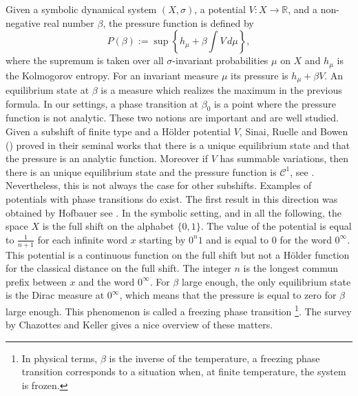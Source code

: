 \documentclass[11 pt]{article}
\def\R{{\mathbb R}}
\def\s{\sigma}
\def\be{\beta}
\theoremstyle{definition}
\begin{document}
Given a symbolic dynamical system $(X,\s)$, a potential  $V:X\to\R$, and a non-negative real number $\beta$, the pressure function is defined by 
$$P(\be):=\sup\left\{h_{\mu}+\be\int V\,d\mu\right\},$$
where the supremum is taken over all $\s$-invariant probabilities $\mu$ on $X$ and $h_{\mu}$ is the Kolmogorov entropy. For an invariant measure $\mu$ its pressure is $h_\mu+\beta V$.
An equilibrium state at $\be$ is a measure which realizes the maximum in the previous formula. In our settings, a phase transition at $\be_{0}$ is a point where the pressure function is not analytic. These two notions are important and are well studied.
Given a subshift of finite type and a H\"older potential $V$, Sinai, Ruelle and Bowen (\cite{sinai,Ruelle.78,Bow.08}) proved in their seminal works that there is a unique equilibrium state and that the pressure is an analytic function. Moreover if $V$ has summable variations, then there is an unique equilibrium state and the pressure function is $\mathcal C^1$, see \cite{Walters.75}.
Nevertheless, this is not always the case for other subshifts. Examples of potentials with phase transitions do exist. The first result in this direction was obtained by  Hofbauer    
see \cite{Hofbauer-77}. In the symbolic setting, and in all the following, the space $X$ is the full shift on the alphabet $\{0,1\}$. The value of the potential is equal to $\frac{1}{n+1}$ for each infinite word $x$ starting by $0^n1$ and is equal to $0$ for the word $0^\infty$. This potential is a continuous function on the full shift but not a H\"older function for the classical distance on the full shift.
The integer $n$ is the longest commun prefix between $x$ and the word $0^\infty$. 
For $\beta$ large enough, the only equilibrium state is the Dirac measure at $0^\infty$, which means that the pressure is equal to zero for $\beta$ large enough. This phenomenon is called a freezing phase transition \footnote{In physical terms, $\beta$ is the inverse of the temperature, a freezing phase transition corresponds to a situation when, at finite temperature, the system is frozen.}. The survey by Chazottes and Keller \cite{Chazottes-Keller-08}  gives a nice overview of these matters.
\\
\end{document}

